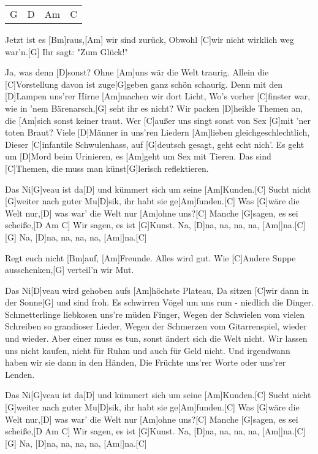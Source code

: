 

\begin{guitar}
	{\footnotesize\begin{tabular}{|l|l|l|l|}
		G & D & Am & C
	\end{tabular}}
	
	Jetzt ist es [Bm]raus,[Am] wir sind zurück,
	Obwohl [C]wir nicht wirklich weg war'n.[G] Ihr sagt: "Zum Glück!"
	
	Ja, was denn [D]sonst? Ohne [Am]uns wär die Welt traurig.
	Allein die [C]Vorstellung davon ist zuge[G]geben ganz schön schaurig.
	Denn mit den [D]Lampen uns'rer Hirne [Am]machen wir dort Licht,
	Wo's vorher [C]finster war, wie in 'nem Bärenarsch,[G] seht ihr es nicht?
	Wir packen [D]heikle Themen an, die [Am]sich sonst keiner traut.
	Wer [C]außer uns singt sonst von Sex [G]mit 'ner toten Braut?
	Viele [D]Männer in uns'ren Liedern [Am]lieben gleichgeschlechtlich,
	Dieser [C]infantile Schwulenhass, auf [G]deutsch gesagt, geht echt nich'.
	Es geht um [D]Mord beim Urinieren, es [Am]geht um Sex mit Tieren.
	Das sind [C]Themen, die muss man künst[G]lerisch reflektieren.
	
	\begin{highlightbar}
		Das Ni[G]veau ist da[D] und kümmert sich um seine [Am]Kunden.[C]{}
		Sucht nicht [G]weiter nach guter Mu[D]sik, ihr habt sie ge[Am]funden.[C]{}
		Was [G]wäre die Welt nur,[D] was war' die Welt nur [Am]ohne uns?[C]{}
		Manche [G]sagen, es sei scheiße,[D Am C]{}
		Wir sagen, es ist [G]Kunst. Na, [D]na, na, na, na, [Am|]{na.}[C]{}
		[G] Na, [D]na, na, na, na, [Am|]{na.}[C]{}
	\end{highlightbar}
	\pagebreak
	\songsection{Strophe 2}
	Regt euch nicht [Bm]auf, [Am]Freunde. Alles wird gut.
	Wie [C]Andere Suppe ausschenken,[G] verteil'n wir Mut.
	
	Das Ni[D]veau wird gehoben aufs [Am]höchste Plateau,
	Da sitzen [C]wir dann in der Sonne[G] und sind froh.
	Es schwirren Vögel um uns rum - niedlich die Dinger.
	Schmetterlinge liebkosen uns're müden Finger,
	Wegen der Schwielen vom vielen Schreiben so grandioser Lieder,
	Wegen der Schmerzen vom Gitarrenspiel, wieder und wieder.
	Aber einer muss es tun, sonst ändert sich die Welt nicht.
	Wir lassen uns nicht kaufen, nicht für Ruhm und auch für Geld nicht.
	Und irgendwann haben wir sie dann in den Händen,
	Die Früchte uns'rer Worte oder uns'rer Lenden.
	
	\begin{highlightbar}
		\songsection{Refrain}
		Das Ni[G]veau ist da[D] und kümmert sich um seine [Am]Kunden.[C]{}
		Sucht nicht [G]weiter nach guter Mu[D]sik, ihr habt sie ge[Am]funden.[C]{}
		Was [G]wäre die Welt nur,[D] was war' die Welt nur [Am]ohne uns?[C]{}
		Manche [G]sagen, es sei scheiße,[D Am C]{}
		Wir sagen, es ist [G]Kunst. Na, [D]na, na, na, na, [Am|]{na.}[C]{}
		[G] Na, [D]na, na, na, na, [Am|]{na.}[C]{}
	\end{highlightbar}
\end{guitar}